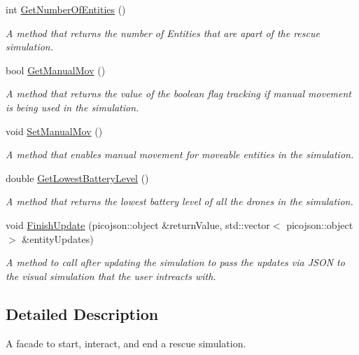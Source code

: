 \begin{DoxyCompactItemize}
int \hyperlink{classRescueSimulation_a6769ffcc2fae87c710dad5f7330b01cb}{Get\+Number\+Of\+Entities} ()
\begin{DoxyCompactList}\small\item\em A method that returns the number of Entities that are apart of the rescue simulation. \end{DoxyCompactList}\item 
bool \hyperlink{classRescueSimulation_a1de477a7e889760895bd174d14221235}{Get\+Manual\+Mov} ()
\begin{DoxyCompactList}\small\item\em A method that returns the value of the boolean flag tracking if manual movement is being used in the simulation. \end{DoxyCompactList}\item 
\mbox{\label{classRescueSimulation_a29d260161bc77cfcd2ae201824489308}} 
void \hyperlink{classRescueSimulation_a29d260161bc77cfcd2ae201824489308}{Set\+Manual\+Mov} ()
\begin{DoxyCompactList}\small\item\em A method that enables manual movement for moveable entities in the simulation. \end{DoxyCompactList}\item 
double \hyperlink{classRescueSimulation_a0acab880cfa4fea96c399a0b54af1593}{Get\+Lowest\+Battery\+Level} ()
\begin{DoxyCompactList}\small\item\em A method that returns the lowest battery level of all the drones in the simulation. \end{DoxyCompactList}\item 
void \hyperlink{classRescueSimulation_abdf13de83b12c3062be5a535a8c02545}{Finish\+Update} (picojson\+::object \&return\+Value, std\+::vector$<$ picojson\+::object $>$ \&entity\+Updates)
\begin{DoxyCompactList}\small\item\em A method to call after updating the simulation to pass the updates via J\+S\+ON to the visual simulation that the user intreacts with. \end{DoxyCompactList}\end{DoxyCompactItemize}


\subsection{Detailed Description}
A facade to start, interact, and end a rescue simulation. 

